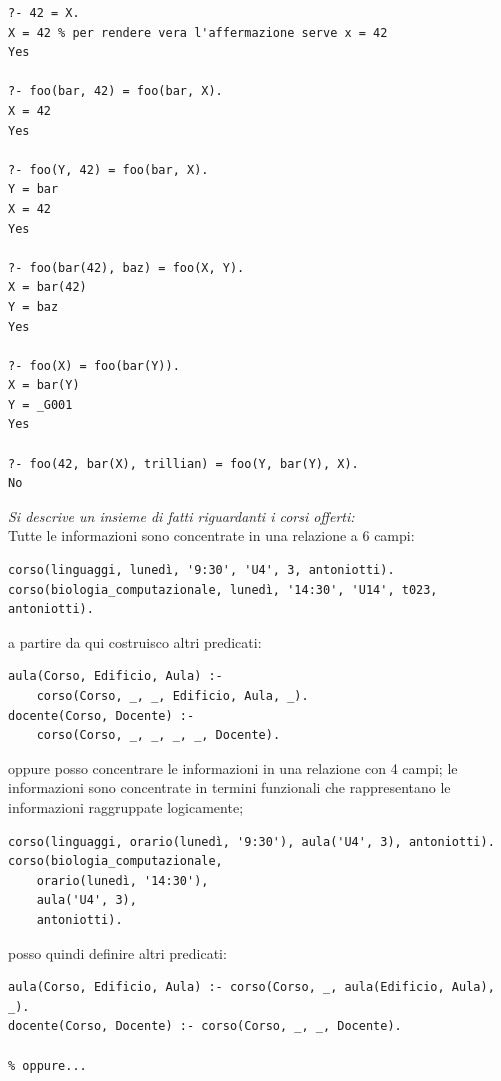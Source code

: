 \documentclass[a4paper,12pt, oneside]{book}
\begin{document}
\begin{itemize}
\begin{verbatim}
?- 42 = X.
X = 42 % per rendere vera l'affermazione serve x = 42
Yes

?- foo(bar, 42) = foo(bar, X).
X = 42
Yes

?- foo(Y, 42) = foo(bar, X).
Y = bar
X = 42
Yes

?- foo(bar(42), baz) = foo(X, Y).
X = bar(42)
Y = baz
Yes

?- foo(X) = foo(bar(Y)).
X = bar(Y)
Y = _G001
Yes

?- foo(42, bar(X), trillian) = foo(Y, bar(Y), X).
No
\end{verbatim}
\begin{esempio}
\textit{Si descrive un insieme di fatti riguardanti i corsi offerti:}\\
Tutte le informazioni sono concentrate in una relazione a 6 campi:
\begin{verbatim}
corso(linguaggi, lunedì, '9:30', 'U4', 3, antoniotti).
corso(biologia_computazionale, lunedì, '14:30', 'U14', t023, antoniotti).
\end{verbatim}
a partire da qui costruisco altri predicati:
\begin{verbatim}
aula(Corso, Edificio, Aula) :-
	corso(Corso, _, _, Edificio, Aula, _).
docente(Corso, Docente) :-
	corso(Corso, _, _, _, _, Docente).
\end{verbatim}
oppure posso concentrare le informazioni in una relazione con 4 campi; le informazioni sono concentrate in termini funzionali che rappresentano le informazioni raggruppate logicamente;
\begin{verbatim}
corso(linguaggi, orario(lunedì, '9:30'), aula('U4', 3), antoniotti).
corso(biologia_computazionale,
	orario(lunedì, '14:30'),
	aula('U4', 3),
	antoniotti).
\end{verbatim}
posso quindi definire altri predicati:
\begin{verbatim}
aula(Corso, Edificio, Aula) :- corso(Corso, _, aula(Edificio, Aula), _).
docente(Corso, Docente) :- corso(Corso, _, _, Docente).

% oppure...


\end{verbatim}
\end{esempio}
\end{itemize}
\end{document}
